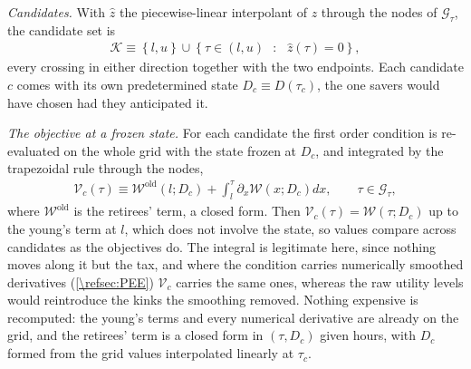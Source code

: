 \emph{Candidates.} With $\hat{z}$ the piecewise-linear interpolant of $z$ through the nodes of $\mathcal{G}_{\tau}$, the candidate set is
\begin{align}\label{\refeq:candidates}
    \mathcal{K} \equiv \left\lbrace l,u \right\rbrace\cup\left\lbrace \tau\in(l,u)\mbox{ }:\mbox{ }\hat{z}(\tau) = 0\right\rbrace,
\end{align}
every crossing in either direction together with the two endpoints. Each candidate $c$ comes with its own predetermined state $D_c \equiv D(\tau_c)$, the one savers would have chosen had they anticipated it.

\emph{The objective at a frozen state.} For each candidate the first order condition is re-evaluated on the whole grid with the state frozen at $D_c$, and integrated by the trapezoidal rule through the nodes,
\begin{align}\label{\refeq:objectiveProfile}
    \mathcal{V}_c(\tau) \equiv \mathcal{W}^{\mathrm{old}}\left(l; D_c\right) + \int_l^{\tau}\partial_{x}\mathcal{W}\left(x; D_c\right)dx, \qquad \tau\in\mathcal{G}_{\tau},
\end{align}
where $\mathcal{W}^{\mathrm{old}}$ is the retirees' term, a closed form. Then $\mathcal{V}_c(\tau) = \mathcal{W}(\tau; D_c)$ up to the young's term at $l$, which does not involve the state, so values compare across candidates as the objectives do. The integral is legitimate here, since nothing moves along it but the tax, and where the condition carries numerically smoothed derivatives (\cref{\refsec:PEE}) $\mathcal{V}_c$ carries the same ones, whereas the raw utility levels would reintroduce the kinks the smoothing removed. Nothing expensive is recomputed: the young's terms and every numerical derivative are already on the grid, and the retirees' term is a closed form in $(\tau, D_c)$ given hours, with $D_c$ formed from the grid values interpolated linearly at $\tau_c$.

